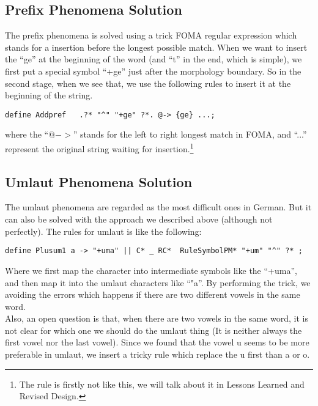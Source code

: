 \documentclass[11pt,letterpaper]{article}
\begin{document}
\subsection{Prefix Phenomena Solution}
The prefix phenomena is solved using a trick FOMA regular expression which stands for a insertion before the longest possible match. When we want to insert the ``ge'' at the beginning of the word (and ``t'' in the end, which is simple), we first put a special symbol ``+ge'' just after the morphology boundary. So in the second stage, when we see that, we use the following rules to insert it at the beginning of the string.
\begin{verbatim}
define Addpref   .?* "^" "+ge" ?*. @-> {ge} ...;
\end{verbatim}
where the ``$@->$'' stands for the left to right longest match in FOMA, and ``...'' represent the original string waiting for insertion.\footnote{The rule is firstly not like this, we will talk about it in Lessons Learned and Revised Design.}
\subsection{Umlaut Phenomena Solution}
The umlaut phenomena are regarded as the most difficult ones in German. But it can also be solved with the approach we described above (although not perfectly). The rules for umlaut is like the following:
\begin{verbatim}
define Plusum1 a -> "+uma" || C* _ RC*  RuleSymbolPM* "+um" "^" ?* ;
\end{verbatim}
Where we first map the character into intermediate symbols like the ``+uma'', and then map it into the umlaut characters like ``"a''. By performing the trick, we avoiding the errors which happens if there are two different vowels in the same word.\\
Also, an open question is that, when there are two vowels in the same word, it is not clear for which one we should do the umlaut thing (It is neither always the first vowel nor the last vowel). Since we found that the vowel u seems to be more preferable in umlaut, we insert a tricky rule which replace the u first than a or o.
\end{document}
